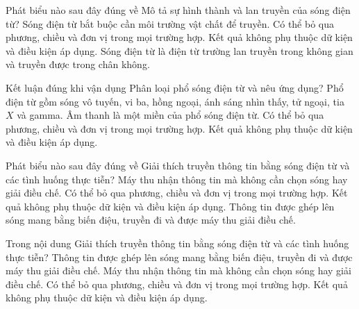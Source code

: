 \begin{ex}
Phát biểu nào sau đây đúng về Mô tả sự hình thành và lan truyền của sóng điện từ?
\choice
{Sóng điện từ bắt buộc cần môi trường vật chất để truyền.}
{Có thể bỏ qua phương, chiều và đơn vị trong mọi trường hợp.}
{Kết quả không phụ thuộc dữ kiện và điều kiện áp dụng.}
{\True Sóng điện từ là điện từ trường lan truyền trong không gian và truyền được trong chân không.}
\end{ex}

\begin{ex}
Kết luận đúng khi vận dụng Phân loại phổ sóng điện từ và nêu ứng dụng?
\choice
{\True Phổ điện từ gồm sóng vô tuyến, vi ba, hồng ngoại, ánh sáng nhìn thấy, tử ngoại, tia $X$ và gamma.}
{Âm thanh là một miền của phổ sóng điện từ.}
{Có thể bỏ qua phương, chiều và đơn vị trong mọi trường hợp.}
{Kết quả không phụ thuộc dữ kiện và điều kiện áp dụng.}
\end{ex}

\begin{ex}
Phát biểu nào sau đây đúng về Giải thích truyền thông tin bằng sóng điện từ và các tình huống thực tiễn?
\choice
{Máy thu nhận thông tin mà không cần chọn sóng hay giải điều chế.}
{Có thể bỏ qua phương, chiều và đơn vị trong mọi trường hợp.}
{Kết quả không phụ thuộc dữ kiện và điều kiện áp dụng.}
{\True Thông tin được ghép lên sóng mang bằng biến điệu, truyền đi và được máy thu giải điều chế.}
\end{ex}

\begin{ex}
Trong nội dung Giải thích truyền thông tin bằng sóng điện từ và các tình huống thực tiễn?
\choice
{\True Thông tin được ghép lên sóng mang bằng biến điệu, truyền đi và được máy thu giải điều chế.}
{Máy thu nhận thông tin mà không cần chọn sóng hay giải điều chế.}
{Có thể bỏ qua phương, chiều và đơn vị trong mọi trường hợp.}
{Kết quả không phụ thuộc dữ kiện và điều kiện áp dụng.}
\end{ex}

